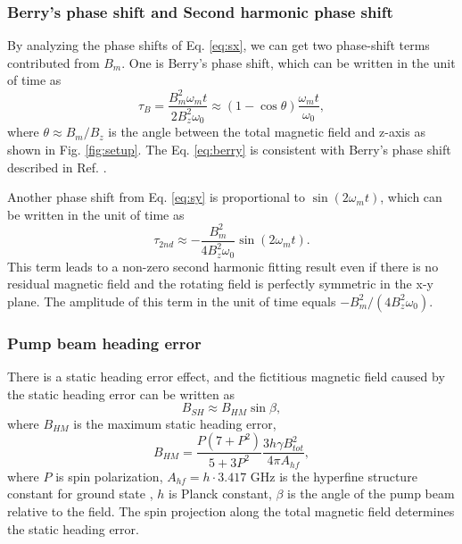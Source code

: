\documentclass[prx,twocolumn,10pt,nofootinbib]{revtex4-1}
\begin{document}
\subsubsection{Berry's phase shift and Second harmonic phase shift}\label{berry}

By analyzing the phase shifts of Eq. \ref{eq:sx}, we can get two phase-shift terms contributed from $B_m$. One is Berry's phase shift, which can be written in the unit of time as
\begin{equation}
	\tau_{B}=\frac{B_m^2 \omega_m t}{2 B_z^2 \omega_0} \approx (1-\cos\theta)\frac{\omega_m t}{\omega_0},
	\label{eq:berry}
\end{equation}
where $\theta \approx B_m/B_z$ is the angle between the total magnetic field and z-axis as shown in Fig. \ref{fig:setup}. The Eq. \ref{eq:berry} is consistent with Berry's phase shift described in Ref. \cite{suter1987berry}.

Another phase shift from Eq. \ref{eq:sy} is proportional to $\sin(2\omega_m t)$, which can be written in the unit of time as 
\begin{equation}
	\tau_{2nd} \approx -\frac{B_m^2}{4B_z^2 \omega_0} \sin(2 \omega_m t).
	\label{eq:2nd_harm}
\end{equation}
This term leads to a non-zero second harmonic fitting result even if there is no residual magnetic field and the rotating field is perfectly symmetric in the x-y plane. The amplitude of this term in the unit of time equals $-B_m^2/(4B_z^2\omega_0)$.


\subsubsection{Pump beam heading error}
There is a static heading error effect, and the fictitious magnetic field caused by the static heading error can be written as \cite{lee2021heading}
\begin{equation}
	B_{SH} \approx B_{HM} \sin \beta,
	\label{eq:B_SHE}
\end{equation}
where $B_{HM}$ is the maximum static heading error,
\begin{equation}
B_{HM} = \frac{P(7+P^2)}{5+3P^2} \frac{3 h \gamma B_{tot}^2}{4 \pi A_{hf}},
\end{equation}
where $P$ is spin polarization, $A_{hf} = h \cdot 3.417$ GHz is the hyperfine structure constant for ground state \cite{bize1999high}, $h$ is Planck constant, $\beta$ is the angle of the pump beam relative to the field. The spin projection along the total magnetic field determines the static heading error.
\end{document}
